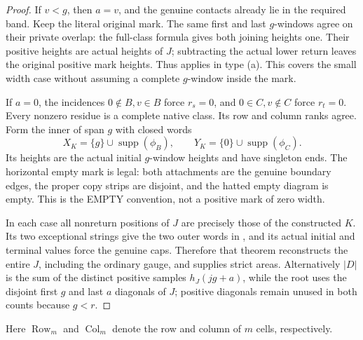 \documentclass[11pt,a4paper]{amsart}
\numberwithin{equation}{section}
\theoremstyle{plain}
\theoremstyle{definition}
\begin{document}
\begin{proof}
If \(v<g\), then \(a=v\), and the genuine contacts already lie
in the required band.  Keep the literal original mark.  The same first
and last \(g\)-windows agree on their private overlap: the full-class
formula gives both joining heights one.  Their positive heights are
actual heights of \(J\); subtracting the actual lower return leaves
the original positive mark heights.  Thus
 applies in type (a).  This covers the small
width case without assuming a complete \(g\)-window inside the mark.

If \(a=0\), the incidences \(0\notin B,v\in B\) force
\(r_s=0\), and \(0\in C,v\notin C\) force \(r_t=0\).
Every nonzero residue is a complete native class.  Its row and column
ranks agree.  Form the inner of span \(g\) with closed words
\[
 X_K=\{g\}\cup\operatorname{supp}(\phi_B),\qquad
 Y_K=\{0\}\cup\operatorname{supp}(\phi_C).
\]
Its heights are the actual initial \(g\)-window heights and have
singleton ends.  The horizontal empty mark is legal: both attachments
are the genuine boundary edges, the proper copy strips are disjoint,
and the hatted empty diagram is empty.  This is the EMPTY convention,
not a positive mark of zero width.

In each case all nonreturn positions of \(J\) are precisely those of
the constructed \(K\).  Its two exceptional strings give the two
outer words in , and its actual initial and terminal
values force the genuine caps.  Therefore that theorem reconstructs the
entire \(J\), including the ordinary gauge, and supplies strict areas.
Alternatively \(|D|\) is the sum of the distinct positive samples
\(h_J(jg+a)\), while the root uses the disjoint first \(g\) and
last \(a\) diagonals of \(J\); positive diagonals remain unused
in both counts because \(g<r\).
\end{proof}

Here \(\operatorname{Row}_m\) and \(\operatorname{Col}_m\) denote the
row and column of \(m\) cells, respectively.
\end{document}

